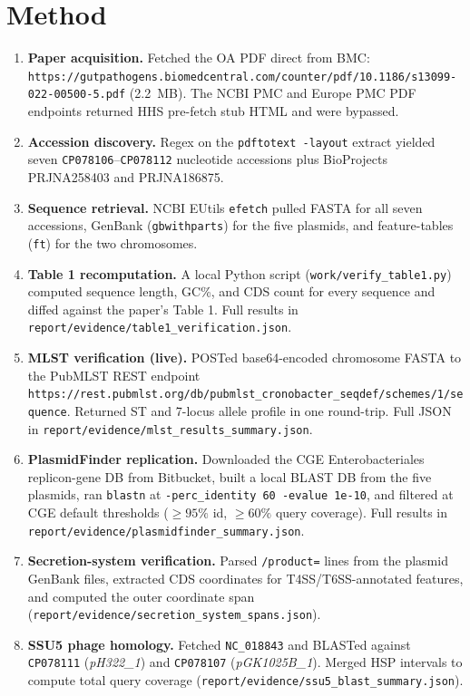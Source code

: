 \documentclass[11pt]{article}
\begin{document}
\section{Method}
\begin{enumerate}
\item \textbf{Paper acquisition.} Fetched the OA PDF direct from BMC:
  \texttt{https://gutpathogens.biomedcentral.com/counter/pdf/10.1186/s13099-022-00500-5.pdf}
  (2.2~MB). The NCBI PMC and Europe PMC PDF endpoints returned HHS pre-fetch stub HTML and were
  bypassed.
\item \textbf{Accession discovery.} Regex on the \texttt{pdftotext -layout} extract yielded seven
  \texttt{CP078106}--\texttt{CP078112} nucleotide accessions plus BioProjects PRJNA258403 and
  PRJNA186875.
\item \textbf{Sequence retrieval.} NCBI EUtils \texttt{efetch} pulled FASTA for all seven
  accessions, GenBank (\texttt{gbwithparts}) for the five plasmids, and feature-tables
  (\texttt{ft}) for the two chromosomes.
\item \textbf{Table 1 recomputation.} A local Python script (\texttt{work/verify\_table1.py})
  computed sequence length, GC\%, and CDS count for every sequence and diffed against the paper's
  Table 1. Full results in \texttt{report/evidence/table1\_verification.json}.
\item \textbf{MLST verification (live).} POSTed base64-encoded chromosome FASTA to the PubMLST
  REST endpoint
  \texttt{https://rest.pubmlst.org/db/pubmlst\_cronobacter\_seqdef/schemes/1/sequence}. Returned ST
  and 7-locus allele profile in one round-trip. Full JSON in
  \texttt{report/evidence/mlst\_results\_summary.json}.
\item \textbf{PlasmidFinder replication.} Downloaded the CGE Enterobacteriales replicon-gene DB
  from Bitbucket, built a local BLAST DB from the five plasmids, ran \texttt{blastn} at
  \texttt{-perc\_identity 60 -evalue 1e-10}, and filtered at CGE default thresholds
  ($\geq 95\%$ id, $\geq 60\%$ query coverage). Full results in
  \texttt{report/evidence/plasmidfinder\_summary.json}.
\item \textbf{Secretion-system verification.} Parsed \texttt{/product=} lines from the plasmid
  GenBank files, extracted CDS coordinates for T4SS/T6SS-annotated features, and computed the
  outer coordinate span (\texttt{report/evidence/secretion\_system\_spans.json}).
\item \textbf{SSU5 phage homology.} Fetched \texttt{NC\_018843} and BLASTed against
  \texttt{CP078111} (\emph{pH322\_1}) and \texttt{CP078107} (\emph{pGK1025B\_1}). Merged HSP
  intervals to compute total query coverage
  (\texttt{report/evidence/ssu5\_blast\_summary.json}).
\end{enumerate}
\end{document}
